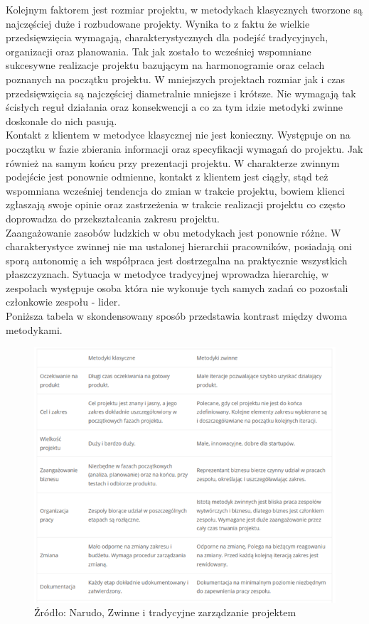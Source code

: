 \documentclass[oneside,polski,logo]{amuthesis}
\begin{document}
Kolejnym faktorem jest rozmiar projektu, w metodykach klasycznych tworzone są najczęściej duże i rozbudowane projekty. Wynika to z faktu że wielkie przedsięwzięcia wymagają, charakterystycznych dla podejść tradycyjnych, organizacji oraz planowania. Tak jak zostało to wcześniej wspomniane sukcesywne realizacje projektu bazującym na harmonogramie oraz celach poznanych na początku projektu. W mniejszych projektach rozmiar jak i czas przedsięwzięcia są najczęściej diametralnie mniejsze i krótsze. Nie wymagają tak ścisłych reguł działania oraz konsekwencji a co za tym idzie metodyki zwinne doskonale do nich pasują.\\

Kontakt z klientem w metodyce klasycznej nie jest konieczny. Występuje on na początku w fazie zbierania informacji oraz specyfikacji wymagań do projektu. Jak również na samym końcu przy prezentacji projektu. W charakterze zwinnym podejście jest ponownie odmienne, kontakt z klientem jest ciągły, stąd też wspomniana wcześniej tendencja do zmian w trakcie projektu, bowiem klienci zgłaszają swoje opinie oraz zastrzeżenia w trakcie realizacji projektu co często doprowadza do przekształcania zakresu projektu.\\

Zaangażowanie zasobów ludzkich w obu metodykach jest ponownie różne. W charakterystyce zwinnej nie ma ustalonej hierarchii pracowników, posiadają oni sporą autonomię a ich współpraca jest dostrzegalna na praktycznie wszystkich płaszczyznach. Sytuacja w metodyce tradycyjnej wprowadza hierarchię, w zespołach występuje osoba która nie wykonuje tych samych zadań co pozostali członkowie zespołu - lider. \cite{modele}\cite{agileVwaterfall}\\

Poniższa tabela w skondensowany sposób przedstawia kontrast między dwoma metodykami.\\

\begin{figure}[h]
	\centering
	\includegraphics[width=15cm]{images/hyps/zwinne-tradycyjne.png}
	\caption{Źródło: Narudo, Zwinne i tradycyjne zarządzanie projektem}
\end{figure}
\end{document}
